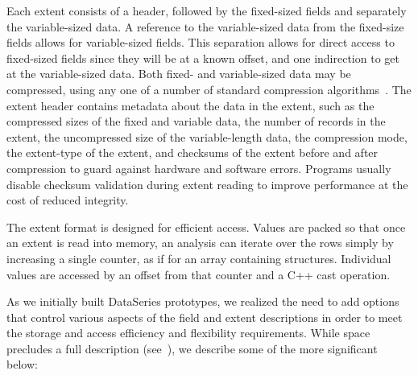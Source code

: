 \documentclass{acm_proc_article-sp}
\begin{document}
Each extent consists of a header, followed by the fixed-sized fields
and separately the variable-sized data.  A reference to the 
variable-sized data from the fixed-size fields allows for variable-sized
fields.  This separation allows for direct access to fixed-sized
fields since they will be at a known offset, and one indirection to
get at the variable-sized data.  Both fixed- and variable-sized data
may be compressed, using any one of a number of standard compression
algorithms~\cite{BZIP,GZIP,LZF,LZO}.  The extent header contains
metadata about the data in the extent, such as the compressed sizes of
the fixed and variable data, the number of records in the extent, the
uncompressed size of the variable-length data, the compression mode,
the extent-type of the extent, and checksums of the extent before and
after compression to guard against hardware and software errors.
Programs usually disable checksum validation during extent reading to
improve performance at the cost of reduced integrity.

The extent format is designed for efficient access. Values are packed
so that once an extent is read into memory, an analysis can iterate
over the rows simply by increasing a single counter, as if for an
array containing structures.  Individual values are accessed by an
offset from that counter and a C++ cast operation. 

As we initially built DataSeries prototypes, we realized the need to
add options that control various aspects of the field and extent
descriptions in order to meet the storage and access efficiency and
flexibility requirements.  While space precludes a full description
(see~\cite{DSTechnicalReportSnapshot}), we describe some of the more
significant below:
\end{document}
